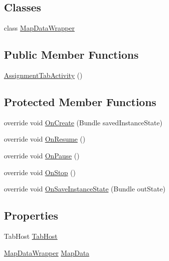 \subsection*{Classes}
\begin{DoxyCompactItemize}
\item 
class \hyperlink{class_field_service_1_1_android_1_1_assignment_tab_activity_1_1_map_data_wrapper}{Map\+Data\+Wrapper}
\end{DoxyCompactItemize}
\subsection*{Public Member Functions}
\begin{DoxyCompactItemize}
\item 
\hyperlink{class_field_service_1_1_android_1_1_assignment_tab_activity_afe089153f9bd511be6ea7d3c3f7007c7}{Assignment\+Tab\+Activity} ()
\end{DoxyCompactItemize}
\subsection*{Protected Member Functions}
\begin{DoxyCompactItemize}
\item 
override void \hyperlink{class_field_service_1_1_android_1_1_assignment_tab_activity_a5848301cb8458d9cf695717831172815}{On\+Create} (Bundle saved\+Instance\+State)
\item 
override void \hyperlink{class_field_service_1_1_android_1_1_assignment_tab_activity_a1804077a17d30444e95247bf5a5eb1fe}{On\+Resume} ()
\item 
override void \hyperlink{class_field_service_1_1_android_1_1_assignment_tab_activity_afabb5b1145cb228bbc6cb500b33b6409}{On\+Pause} ()
\item 
override void \hyperlink{class_field_service_1_1_android_1_1_assignment_tab_activity_a64f126db3b19f9f196ea2ee665cd2845}{On\+Stop} ()
\item 
override void \hyperlink{class_field_service_1_1_android_1_1_assignment_tab_activity_a5da219c3c8f04276b4dd357465c9aed7}{On\+Save\+Instance\+State} (Bundle out\+State)
\end{DoxyCompactItemize}
\subsection*{Properties}
\begin{DoxyCompactItemize}
\item 
Tab\+Host \hyperlink{class_field_service_1_1_android_1_1_assignment_tab_activity_a7ffe46f2a76590c548c545e11a375fcb}{Tab\+Host}
\item 
\hyperlink{class_field_service_1_1_android_1_1_assignment_tab_activity_1_1_map_data_wrapper}{Map\+Data\+Wrapper} \hyperlink{class_field_service_1_1_android_1_1_assignment_tab_activity_a3e356c26ab2592fc60ad32d2cc5ac010}{Map\+Data}
\end{DoxyCompactItemize}



